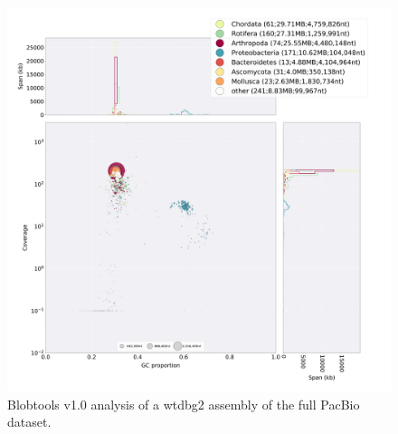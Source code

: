 \begin{figure}[ht]
    \centering
     \includegraphics[width=15cm]{fig/benchmark/PB_WTDBG.png}
   \caption{Blobtools v1.0 analysis of a wtdbg2 assembly of the full PacBio dataset.}
   \label{fig:blobtools_wtdbg2_pb}
 \end{figure}


